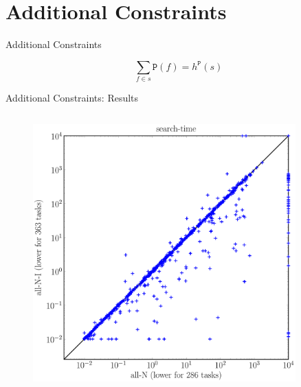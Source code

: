 \documentclass[aspectratio=169, xcolor=dvipsnames]{beamer}
\begin{document}
    \section{Additional Constraints}
    \begin{frame}[c]{Additional Constraints}
        \begin{definition}
            \[\sum_{f\in s}\mathtt{P}(f)=h^\mathtt{P}(s)\]
        \end{definition}
    \end{frame}

    \begin{frame}[c]{Additional Constraints: Results}
        \begin{columns}
            \begin{figure}
                \includegraphics[width=0.9\textwidth]{all_I_search}
            \end{figure}


\end{columns}
\end{frame}
\end{document}
